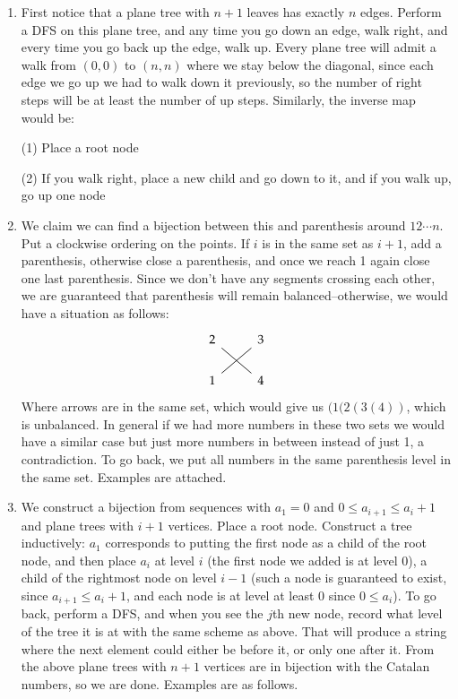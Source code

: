 \documentclass[12pt]{article}
\theoremstyle{definition}
\theoremstyle{remark}
\begin{document}
\begin{enumerate}[leftmargin=\labelsep]
		\item First notice that a plane tree with $n+1$ leaves has exactly $n$ edges. Perform a DFS on this plane tree, and any time you go down an edge, walk right, and every time you go back up the edge, walk up. Every plane tree will admit a walk from $(0, 0)$ to $(n, n)$ where we stay below the diagonal, since each edge we go up we had to walk down it previously, so the number of right steps will be at least the number of up steps. Similarly, the inverse map would be: 
		
		(1) Place a root node
		
		(2) If you walk right, place a new child and go down to it, and if you walk up, go up one node
		
		\item We claim we can find a bijection between this and parenthesis around $12 \cdots n$. Put a clockwise ordering on the points. If $i$ is in the same set as $i+1$, add a parenthesis, otherwise close a parenthesis, and once we reach 1 again close one last parenthesis. Since we don't have any segments crossing each other, we are guaranteed that parenthesis will remain balanced--otherwise, we would have a situation as follows:
		\[\begin{tikzcd}
			2 & 3 \\
			1 & 4
			\arrow[no head, from=2-1, to=1-2]
			\arrow[no head, from=1-1, to=2-2]
		\end{tikzcd}\]
		Where arrows are in the same set, which would give us $(1(2(3(4))$, which is unbalanced. In general if we had more numbers in these two sets we would have a similar case but just more numbers in between instead of just 1, a contradiction. To go back, we put all numbers in the same parenthesis level in the same set. Examples are attached.
		
		
		\item We construct a bijection from sequences with $a_1 = 0$ and $0 \leq a_{i+1} \leq a_i + 1$ and plane trees with $i+1$ vertices. Place a root node. Construct a tree inductively: $a_1$ corresponds to putting the first node as a child of the root node, and then place $a_i$ at level $i$ (the first node we added is at level 0), a child of the rightmost node on level $i-1$ (such a node is guaranteed to exist, since $a_{i+1} \leq a_i + 1$, and each node is at level at least 0 since $0 \leq a_i$). To go back, perform a DFS, and when you see the $j$th new node, record what level of the tree it is at with the same scheme as above. That will produce a string where the next element could either be before it, or only one after it. From the above plane trees with $n+1$ vertices are in bijection with the Catalan numbers, so we are done. Examples are as follows.
		

\end{enumerate}
\end{document}

